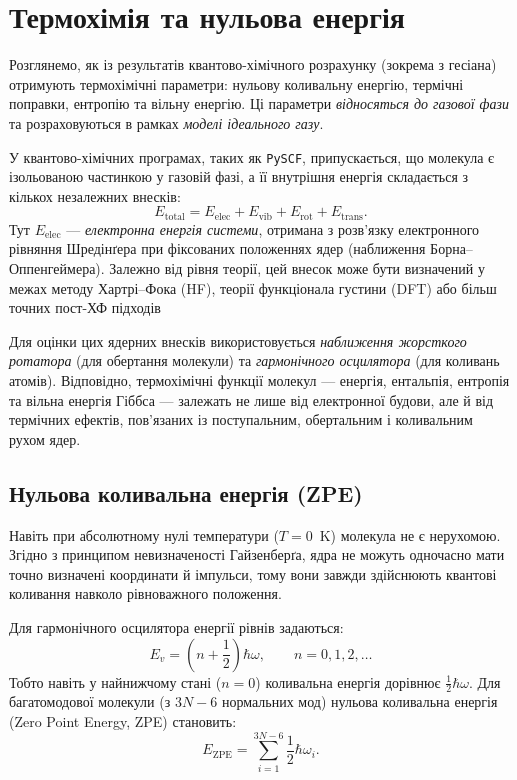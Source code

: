 \section{Термохімія та нульова енергія}


Розглянемо, як із результатів квантово-хімічного
розрахунку (зокрема з гесіана) отримують термохімічні параметри:
нульову коливальну енергію, термічні поправки, ентропію та вільну енергію.
Ці параметри \emph{відносяться до газової фази} та
розраховуються в рамках \emph{моделі ідеального газу}.

У квантово-хімічних програмах, таких як \texttt{PySCF},
припускається, що молекула є ізольованою частинкою у газовій фазі,
а її внутрішня енергія складається з кількох незалежних внесків:
\[
E_{\text{total}} = E_{\text{elec}} + E_{\text{vib}} + E_{\text{rot}} + E_{\text{trans}}.
\]
Тут $E_{\text{elec}}$ --- \emph{електронна енергія системи},
отримана з розв’язку електронного рівняння Шредінґера
при фіксованих положеннях ядер (наближення Борна–Оппенгеймера).
Залежно від рівня теорії, цей внесок може бути визначений
у межах методу Хартрі–Фока (HF), теорії функціонала густини (DFT)
або більш точних пост-ХФ підходів

Для оцінки цих ядерних внесків використовується
\emph{наближення жорсткого ротатора} (для обертання молекули)
та \emph{гармонічного осцилятора} (для коливань атомів).
Відповідно, термохімічні функції молекул —
енергія, ентальпія, ентропія та вільна енергія Гіббса —
залежать не лише від електронної будови, але й від термічних ефектів,
пов’язаних із поступальним, обертальним і коливальним рухом ядер.



\subsection{Нульова коливальна енергія (ZPE)}

Навіть при абсолютному нулі температури ($T=0$~K) молекула не є нерухомою.
Згідно з принципом невизначеності Гайзенберґа, ядра не можуть одночасно
мати точно визначені координати й імпульси, тому вони завжди здійснюють
квантові коливання навколо рівноважного положення.

Для гармонічного осцилятора енергії рівнів задаються:
\[
E_v = \left(n + \frac{1}{2}\right)\hbar\omega, \qquad n = 0, 1, 2, \ldots
\]
Тобто навіть у найнижчому стані ($n=0$) коливальна енергія дорівнює
$\tfrac{1}{2}\hbar\omega$.
Для багатомодової молекули (з $3N-6$ нормальних мод)
нульова коливальна енергія (Zero Point Energy, ZPE) становить:
\[
E_{\text{ZPE}} = \sum_{i=1}^{3N-6} \frac{1}{2}\hbar\omega_i.
\]

